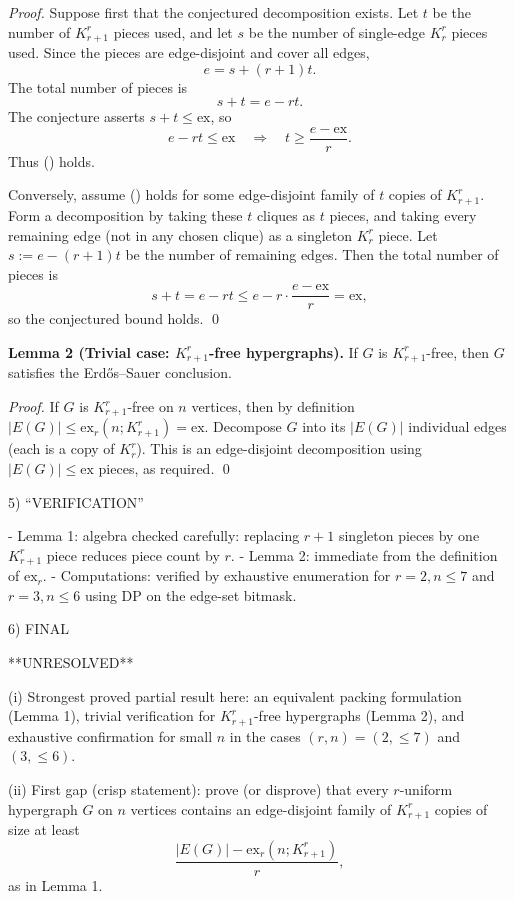 \emph{Proof.}
Suppose first that the conjectured decomposition exists. Let $t$ be the number of $K_{r+1}^r$ pieces used, and let $s$ be the number of single-edge $K_r^r$ pieces used. Since the pieces are edge-disjoint and cover all edges,
\[
 e = s + (r+1)t.
\]
The total number of pieces is
\[
 s+t = e - r t.
\]
The conjecture asserts $s+t\le \mathrm{ex}$, so
\[
 e - r t \le \mathrm{ex}\quad\Longrightarrow\quad t\ge \frac{e-\mathrm{ex}}{r}.
\]
Thus (\*) holds.

Conversely, assume (\*) holds for some edge-disjoint family of $t$ copies of $K_{r+1}^r$.
Form a decomposition by taking these $t$ cliques as $t$ pieces, and taking every remaining edge (not in any chosen clique) as a singleton $K_r^r$ piece. Let $s:=e-(r+1)t$ be the number of remaining edges. Then the total number of pieces is
\[
 s+t = e - r t \le e - r\cdot\frac{e-\mathrm{ex}}{r}=\mathrm{ex},
\]
so the conjectured bound holds.
\qed

\medskip
\textbf{Lemma 2 (Trivial case: $K_{r+1}^r$-free hypergraphs).}
If $G$ is $K_{r+1}^r$-free, then $G$ satisfies the Erd\H{o}s--Sauer conclusion.

\emph{Proof.}
If $G$ is $K_{r+1}^r$-free on $n$ vertices, then by definition $|E(G)|\le \mathrm{ex}_r(n;K_{r+1}^r)=\mathrm{ex}$.
Decompose $G$ into its $|E(G)|$ individual edges (each is a copy of $K_r^r$). This is an edge-disjoint decomposition using $|E(G)|\le \mathrm{ex}$ pieces, as required.
\qed

5) “VERIFICATION”

- Lemma 1: algebra checked carefully: replacing $r+1$ singleton pieces by one $K_{r+1}^r$ piece reduces piece count by $r$.
- Lemma 2: immediate from the definition of $\mathrm{ex}_r$.
- Computations: verified by exhaustive enumeration for $r=2,n\le 7$ and $r=3,n\le 6$ using DP on the edge-set bitmask.

6) FINAL

**UNRESOLVED**

(i) Strongest proved partial result here: an equivalent packing formulation (Lemma 1), trivial verification for $K_{r+1}^r$-free hypergraphs (Lemma 2), and exhaustive confirmation for small $n$ in the cases $(r,n)=(2,\le 7)$ and $(3,\le 6)$.

(ii) First gap (crisp statement): prove (or disprove) that every $r$-uniform hypergraph $G$ on $n$ vertices contains an edge-disjoint family of $K_{r+1}^r$ copies of size at least
\[
\frac{|E(G)|-\mathrm{ex}_r(n;K_{r+1}^r)}{r},
\]
as in Lemma 1.

